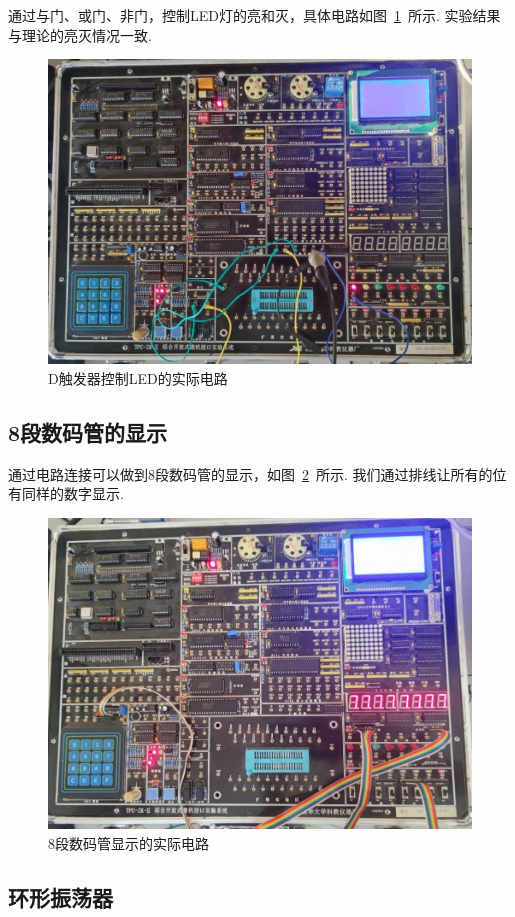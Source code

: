 \documentclass[11pt]{SEU-Digital-Report}
\begin{document}
            通过与门、或门、非门，控制LED灯的亮和灭，具体电路如图~\ref{fig:LED}~所示.
            实验结果与理论的亮灭情况一致.

            \begin{figure}[htbp]
                \centering
                \includegraphics[width=.6\linewidth]{fig/LED.jpg}
                \caption{D触发器控制LED的实际电路}
                \label{fig:LED}
            \end{figure}

        \subsection{8段数码管的显示}

            通过电路连接可以做到8段数码管的显示，如图~\ref{fig:digit_LED}~所示.
            我们通过排线让所有的位有同样的数字显示.

            \begin{figure}[htbp]
                \centering
                \includegraphics[width=.6\linewidth]{fig/Digit_LED.jpg}
                \caption{8段数码管显示的实际电路}
                \label{fig:digit_LED}
            \end{figure}

        \subsection{环形振荡器}
\end{document}
